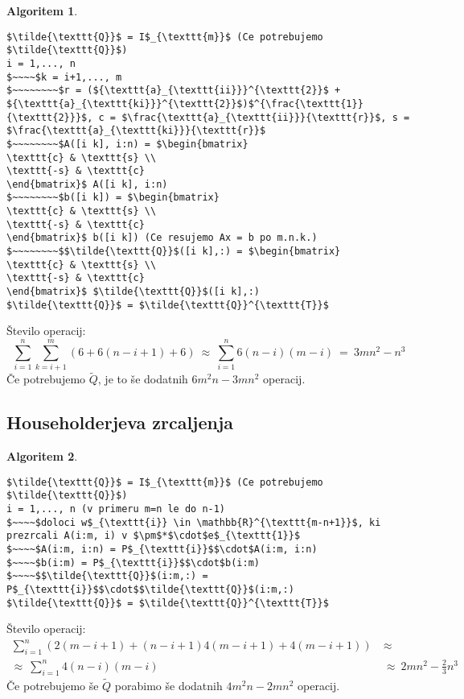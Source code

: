 \documentclass[11pt]{article}
\theoremstyle{definition}
\newtheorem*{algoritem}{Algoritem}
\begin{document}
\begin{algoritem}
~
\begin{lstlisting}
$\tilde{\texttt{Q}}$ = I$_{\texttt{m}}$ (Ce potrebujemo $\tilde{\texttt{Q}}$)
i = 1,..., n
$~~~~$k = i+1,..., m
$~~~~~~~~$r = (${\texttt{a}_{\texttt{ii}}}^{\texttt{2}}$ + ${\texttt{a}_{\texttt{ki}}}^{\texttt{2}}$)$^{\frac{\texttt{1}}{\texttt{2}}}$, c = $\frac{\texttt{a}_{\texttt{ii}}}{\texttt{r}}$, s = $\frac{\texttt{a}_{\texttt{ki}}}{\texttt{r}}$
$~~~~~~~~$A([i k], i:n) = $\begin{bmatrix}
\texttt{c} & \texttt{s} \\
\texttt{-s} & \texttt{c}
\end{bmatrix}$ A([i k], i:n)
$~~~~~~~~$b([i k]) = $\begin{bmatrix}
\texttt{c} & \texttt{s} \\
\texttt{-s} & \texttt{c}
\end{bmatrix}$ b([i k]) (Ce resujemo Ax = b po m.n.k.)
$~~~~~~~~$$\tilde{\texttt{Q}}$([i k],:) = $\begin{bmatrix}
\texttt{c} & \texttt{s} \\
\texttt{-s} & \texttt{c}
\end{bmatrix}$ $\tilde{\texttt{Q}}$([i k],:)
$\tilde{\texttt{Q}}$ = $\tilde{\texttt{Q}}^{\texttt{T}}$
\end{lstlisting}
Število operacij:
$$\sum_{i=1}^n \sum_{k=i+1}^m \left(6 + 6(n-i+1) + 6 \right) ~\approx~ \sum_{i=1}^n 6(n-i)(m-i) ~=~ 3mn^2 - n^3$$
Če potrebujemo $\tilde{Q}$, je to še dodatnih $6m^2n - 3mn^2$ operacij.

\end{algoritem}
\vspace{0.5cm}


\subsection{Householderjeva zrcaljenja}

\begin{algoritem}
~
\begin{lstlisting}
$\tilde{\texttt{Q}}$ = I$_{\texttt{m}}$ (Ce potrebujemo $\tilde{\texttt{Q}}$)
i = 1,..., n (v primeru m=n le do n-1)
$~~~~$doloci w$_{\texttt{i}} \in \mathbb{R}^{\texttt{m-n+1}}$, ki prezrcali A(i:m, i) v $\pm$*$\cdot$e$_{\texttt{1}}$
$~~~~$A(i:m, i:n) = P$_{\texttt{i}}$$\cdot$A(i:m, i:n)
$~~~~$b(i:m) = P$_{\texttt{i}}$$\cdot$b(i:m)
$~~~~$$\tilde{\texttt{Q}}$(i:m,:) = P$_{\texttt{i}}$$\cdot$$\tilde{\texttt{Q}}$(i:m,:)
$\tilde{\texttt{Q}}$ = $\tilde{\texttt{Q}}^{\texttt{T}}$
\end{lstlisting}
Število operacij:
\begin{align*}
\sum_{i=1}^n (2(m-i+1) + (n-i+1)4(m-i+1) + 4(m-i+1)) ~&\approx~ \\
\approx~ \sum_{i=1}^n 4(n-i)(m-i) ~&\approx~ 2mn^2 - \frac{2}{3}n^3
\end{align*}
Če potrebujemo še $\tilde{Q}$ porabimo še dodatnih $4m^2n - 2mn^2$ operacij.

\end{algoritem}
\vspace{0.5cm}
\end{document}
